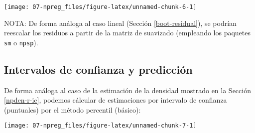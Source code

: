 \documentclass[
]{book}
\newenvironment{Shaded}{\begin{snugshade}}{\end{snugshade}}
\newcommand{\DataTypeTok}[1]{\textcolor[rgb]{0.13,0.29,0.53}{#1}}
\newcommand{\DecValTok}[1]{\textcolor[rgb]{0.00,0.00,0.81}{#1}}
\newcommand{\FloatTok}[1]{\textcolor[rgb]{0.00,0.00,0.81}{#1}}
\newcommand{\KeywordTok}[1]{\textcolor[rgb]{0.13,0.29,0.53}{\textbf{#1}}}
\newcommand{\NormalTok}[1]{#1}
\newcommand{\OperatorTok}[1]{\textcolor[rgb]{0.81,0.36,0.00}{\textbf{#1}}}
\newcommand{\StringTok}[1]{\textcolor[rgb]{0.31,0.60,0.02}{#1}}
\theoremstyle{break}
\theoremstyle{definition}
\theoremstyle{definition}
\theoremstyle{definition}
\theoremstyle{remark}
\begin{document}
\begin{center}\texttt{[image: 07-npreg\_files/figure-latex/unnamed-chunk-6-1]} \end{center}

NOTA: De forma análoga al caso lineal (Sección \ref{boot-residual}), se podrían reescalar los residuos a partir de la matriz de suavizado (empleando los paquetes \texttt{sm} o \texttt{npsp}).

\hypertarget{intervalos-de-confianza-y-predicciuxf3n}{%
\subsection{Intervalos de confianza y predicción}\label{intervalos-de-confianza-y-predicciuxf3n}}

De forma análoga al caso de la estimación de la densidad mostrado en la Sección \ref{npden-r-ic}, podemos cálcular de estimaciones por intervalo de confianza (puntuales) por el método percentil (básico):

\begin{Shaded}
\end{Shaded}

\begin{center}\texttt{[image: 07-npreg\_files/figure-latex/unnamed-chunk-7-1]} \end{center}
\end{document}
